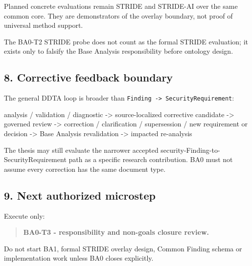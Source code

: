 \documentclass[
  10pt,
  a4paper,
]{article}
\newenvironment{Shaded}{}{}
\newcommand{\NormalTok}[1]{#1}
\begin{document}
Planned concrete evaluations remain STRIDE and STRIDE-AI over the same
common core. They are demonstrators of the overlay boundary, not proof
of universal method support.

The BA0-T2 STRIDE probe does not count as the formal STRIDE evaluation;
it exists only to falsify the Base Analysis responsibility before
ontology design.

\subsection{8. Corrective feedback
boundary}\label{8-corrective-feedback-boundary}

The general DDTA loop is broader than
\texttt{Finding\ -\textgreater{}\ SecurityRequirement}:

\begin{Shaded}
\begin{Highlighting}[]
\NormalTok{analysis / validation / diagnostic}
\NormalTok{ {-}\textgreater{} source{-}localized corrective candidate}
\NormalTok{ {-}\textgreater{} governed review}
\NormalTok{ {-}\textgreater{} correction / clarification / supersession / new requirement or decision}
\NormalTok{ {-}\textgreater{} Base Analysis revalidation}
\NormalTok{ {-}\textgreater{} impacted re{-}analysis}
\end{Highlighting}
\end{Shaded}

The thesis may still evaluate the narrower accepted
security-Finding-to-SecurityRequirement path as a specific research
contribution. BA0 must not assume every correction has the same document
type.

\subsection{9. Next authorized
microstep}\label{9-next-authorized-microstep}

Execute only:

\begin{quote}
\textbf{BA0-T3 - responsibility and non-goals closure review.}
\end{quote}

Do not start BA1, formal STRIDE overlay design, Common Finding schema or
implementation work unless BA0 closes explicitly.
\end{document}
